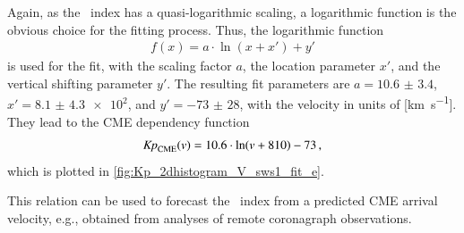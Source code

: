 Again, as the \Kp~index has a quasi-logarithmic scaling, a logarithmic function is the obvious choice for the fitting process. Thus, the logarithmic function
\begin{align}
	f(x) = a \cdot \ln\left(x + x'\right) + y'	\label{eq:log_offset_fit_function}
\end{align}
is used for the fit, with the scaling factor $a$, the location parameter $x'$, and the vertical shifting parameter $y'$. The resulting fit parameters are $a = \num{10.6(34)}$, $x' = \num{8.1(43)e2}$, and $y' = \num{-73(28)}$, with the velocity in units of [\si{\km\per\s}].
They lead to the CME dependency function
\begin{align}
	\text{\textit{Kp}}_\text{CME}(v) = 10.6 \cdot \ln(v + 810) - 73	\,,	\label{eq:kpvsv_CME_dependency_function}
\end{align}
which is plotted in \autoref{fig:Kp_2dhistogram_V_sws1_fit_e}.
\begin{figure}
\end{figure}

This relation can be used to forecast the \Kp{}~index from a predicted CME arrival velocity, e.g., obtained from analyses of remote coronagraph observations.


